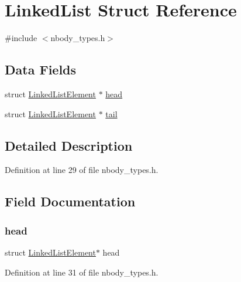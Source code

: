 \hypertarget{struct_linked_list}{}\section{Linked\+List Struct Reference}
\label{struct_linked_list}


{\ttfamily \#include $<$nbody\+\_\+types.\+h$>$}

\subsection*{Data Fields}
\begin{DoxyCompactItemize}
\item 
struct \hyperlink{struct_linked_list_element}{Linked\+List\+Element} $\ast$ \hyperlink{struct_linked_list_a92842e4a76a05ad592d19f07a60db019}{head}
\item 
struct \hyperlink{struct_linked_list_element}{Linked\+List\+Element} $\ast$ \hyperlink{struct_linked_list_a8bc37f643ec6dee9b1a03872b546fd5b}{tail}
\end{DoxyCompactItemize}


\subsection{Detailed Description}


Definition at line 29 of file nbody\+\_\+types.\+h.



\subsection{Field Documentation}
\hypertarget{struct_linked_list_a92842e4a76a05ad592d19f07a60db019}{}\label{struct_linked_list_a92842e4a76a05ad592d19f07a60db019} 
\subsubsection{\texorpdfstring{head}{head}}
{\footnotesize\ttfamily struct \hyperlink{struct_linked_list_element}{Linked\+List\+Element}$\ast$ head}



Definition at line 31 of file nbody\+\_\+types.\+h.

\hypertarget{struct_linked_list_a8bc37f643ec6dee9b1a03872b546fd5b}{}\label{struct_linked_list_a8bc37f643ec6dee9b1a03872b546fd5b} 

